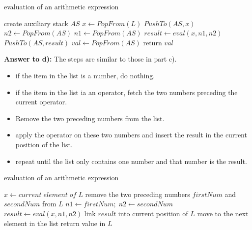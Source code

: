 \documentclass[a4paper,11pt]{article}
\theoremstyle{mytheor}
\begin{document}
\begin{algorithm}[H]
\caption{evaluation of an arithmetic expression}\label{sec:TREEEVALUATION_2_6_C}
\begin{algorithmic}[1]
  \State create auxiliary stack $AS$
    \State $x \gets PopFrom(L)$
      \State $PushTo(AS, x)$ 
    \Else
      \State $n2 \gets PopFrom(AS)$
      \State $n1 \gets PopFrom(AS)$
      \State $result \gets eval(x, n1, n2)$
      \State $PushTo(AS, result)$
    \EndIf
  \EndWhile
  \State $val \gets PopFrom(AS)$
  \State return $val$
\EndFunction
\end{algorithmic}
\end{algorithm}

\vspace{1.2in}

\noindent\textbf{Answer to d):} The steps are similar to those in part c). 
\begin{itemize}
    \item if the item in the list is a number, do nothing.
    \item if the item in the list ia an operator, fetch the two numbers preceding the current operator. \item Remove the two preceding numbers from the list. \item apply the operator on these two numbers and insert the result in the current position of the list. \item repeat until the list only contains one number and that number is the result.
\end{itemize}

\begin{algorithm}[H]
\caption{evaluation of an arithmetic expression}\label{sec:TREEEVALUATION_2_6_D}
\begin{algorithmic}[1]
    \State $x \gets current\;element\;of\; L$
      \State remove the two preceding numbers $firstNum$ and $secondNum$ from $L$
      \State $n1 \gets firstNum;\;n2 \gets secondNum$
      \State $result \gets eval(x, n1, n2)$ 
      \State link $result$ into current position of $L$
    \EndIf
    \State move to the next element in the list
  \EndWhile
  \State return value in $L$
\EndFunction
\end{algorithmic}
\end{algorithm}
\end{document}
